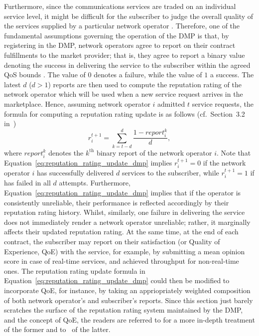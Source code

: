 Furthermore, since the communications services are traded on an individual service level, it might be difficult for the subscriber to judge the overall quality of the services supplied by a particular network operator \cite{DMIrvine02}. Therefore, one of the fundamental assumptions governing the operation of the DMP is that, by registering in the DMP, network operators agree to report on their contract fulfillments to the market provider; that is, they agree to report a binary value denoting the success in delivering the service to the subscriber within the agreed QoS bounds \cite{DMLeBodic00}. The value of $0$ denotes a failure, while the value of $1$ a success. The latest $d$ ($d>1$) reports are then used to compute the reputation rating of the network operator which will be used when a new service request arrives in the marketplace. Hence, assuming network operator $i$ admitted $t$ service requests, the formula for computing a reputation rating update is as follows (cf.~Section~3.2 in~\cite{DMLeBodic00})
\begin{equation}
    \label{eq:reputation_rating_update_dmp}
    r_i^{t+1} = \sum_{k = t-d}^d \frac{1 - report_i^k}{d},
\end{equation}
where $report_i^k$ denotes the $k^{\text{th}}$ binary report of the network operator $i$. Note that Equation~\eqref{eq:reputation_rating_update_dmp} implies $r_i^{t+1} = 0$ if the network operator $i$ has successfully delivered $d$ services to the subscriber, while $r_i^{t+1} = 1$ if has failed in all $d$ attempts. Furthermore, Equation~\eqref{eq:reputation_rating_update_dmp} implies that if the operator is consistently unreliable, their performance is reflected accordingly by their reputation rating history. Whilst, similarly, one failure in delivering the service does not immediately render a network operator unreliable; rather, it marginally affects their updated reputation rating. At the same time, at the end of each contract, the subscriber may report on their satisfaction (or Quality of Experience, QoE) with the service, for example, by submitting a mean opinion score in case of real-time services, and achieved throughput for non-real-time ones. The reputation rating update formula in Equation~\eqref{eq:reputation_rating_update_dmp} could then be modified to incorporate QoE, for instance, by taking an appriopriately weighted composition of both network operator's and subscriber's reports. Since this section just barely scratches the surface of the reputation rating system maintained by the DMP, and the concept of QoE, the readers are referred to \cite{DMLeBodic00,DMIrvine01,DMIrvine02,LeBodicThesis,DMMathur02,DMMcDiarmid06} for a more in-depth treatment of the former and to~\cite{Kilkki2008, BrooksHestnes2010, Fiedler2010, Shaikh2010} of the latter.

